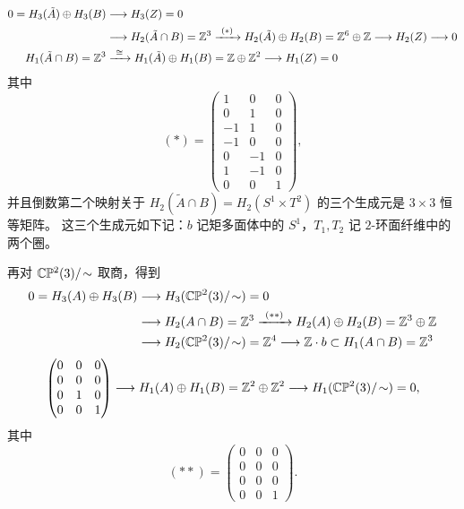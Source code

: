 \[
\begin{aligned}
0=H_3(\tilde A)\oplus H_3(B)&\longrightarrow H_3(Z)=0\\
&\longrightarrow H_2(\tilde A\cap B)=\mathbb{Z}^3
  \xrightarrow{\ (*)\ } H_2(\tilde A)\oplus H_2(B)=\mathbb{Z}^6\oplus\mathbb{Z}
  \longrightarrow H_2(Z)\longrightarrow 0\\
H_1(\tilde A\cap B)=\mathbb{Z}^3&\xrightarrow{\ \cong\ } H_1(\tilde A)\oplus H_1(B)=\mathbb{Z}\oplus\mathbb{Z}^2
  \longrightarrow H_1(Z)=0
\end{aligned}
\]
其中
\[
(*)=\begin{pmatrix}
1&0&0\\
0&1&0\\
-1&1&0\\
-1&0&0\\
0&-1&0\\
1&-1&0\\
0&0&1
\end{pmatrix},
\]
并且倒数第二个映射关于 $H_2(\tilde A\cap B)=H_2(S^1\times T^2)$ 的三个生成元是 $3\times3$ 恒等矩阵。
这三个生成元如下记：$b$ 记矩多面体中的 $S^1$，$T_1,T_2$ 记 $2$-环面纤维中的两个圈。

再对 $\mathbb{C}\mathbb{P}^2(3)/\!\sim$ 取商，得到
\[
\begin{aligned}
0=H_3(A)\oplus H_3(B)&\longrightarrow H_3(\mathbb{C}\mathbb{P}^2(3)/\!\sim)=0\\
&\longrightarrow H_2(A\cap B)=\mathbb{Z}^3
  \xrightarrow{\ (**)\ } H_2(A)\oplus H_2(B)=\mathbb{Z}^3\oplus\mathbb{Z}\\
&\longrightarrow H_2(\mathbb{C}\mathbb{P}^2(3)/\!\sim)=\mathbb{Z}^4
  \longrightarrow \mathbb{Z}\cdot b\subset H_1(A\cap B)=\mathbb{Z}^3
\end{aligned}
\]
\[
\begin{pmatrix}
0&0&0\\
0&0&0\\
0&1&0\\
0&0&1
\end{pmatrix}
\longrightarrow H_1(A)\oplus H_1(B)=\mathbb{Z}^2\oplus\mathbb{Z}^2
\longrightarrow H_1(\mathbb{C}\mathbb{P}^2(3)/\!\sim)=0,
\]
其中
\[
(**)=\begin{pmatrix}
0&0&0\\
0&0&0\\
0&0&0\\
0&0&1
\end{pmatrix}.
\]

